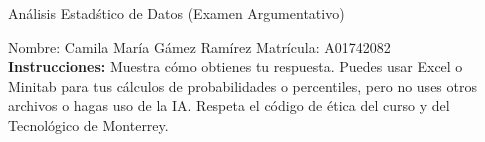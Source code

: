 \documentclass[8pt]{report}
\begin{document}
\newpage



\begin{center}
{An\'alisis Estad\'stico de Datos (Examen Argumentativo)}
\end{center}

Nombre: \underline{\hspace*{.2in}}
Camila María Gámez Ramírez
\underline{\hspace*{.2in}} \quad Matr\'icula:\underline{\hspace*{.2in}}
A01742082
\underline{\hspace*{.2in}} \\

{\bf Instrucciones:} Muestra c\'omo obtienes tu respuesta. Puedes usar Excel 
o Minitab para tus cálculos de probabilidades o 
percentiles, pero no uses otros archivos o hagas uso de la IA. Respeta el 
c\'odigo de \'etica del curso y del Tecnol\'ogico 
de Monterrey.
\end{document}
